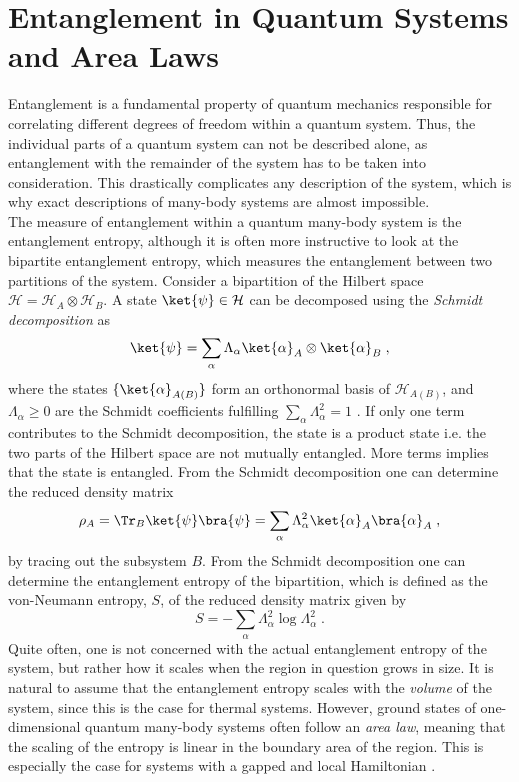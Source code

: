 \section{Entanglement in Quantum Systems and Area Laws}
Entanglement is a fundamental property of quantum mechanics responsible for correlating different degrees of freedom within a quantum system. Thus, the individual parts of a quantum system can not be described alone, as entanglement with the remainder of the system has to be taken into consideration. This drastically complicates any description of the system, which is why exact descriptions of many-body systems are almost impossible.\\
The measure of entanglement within a quantum many-body system is the entanglement entropy, although it is often more instructive to look at the bipartite entanglement entropy, which measures the entanglement between two partitions of the system.
Consider a bipartition of the Hilbert space $\mathcal{H} = \mathcal{H}_A \otimes \mathcal{H}_B$. A state $\ket{\psi} \in \mathcal{H}$ can be decomposed using the \textit{Schmidt decomposition} as
\begin{equation}
	\ket{\psi} = \sum_{\alpha} \Lambda_{\alpha} \ket{\alpha}_A \otimes \ket{\alpha}_B \; ,
\end{equation}
where the states $\{ \ket{\alpha}_{A(B)} \}$ form an orthonormal basis of $\mathcal{H}_{A(B)}$, and $\Lambda_{\alpha} \ge 0$ are the Schmidt coefficients fulfilling $\sum_{\alpha} \Lambda_{\alpha}^2 = 1$ \cite{Pathak2013}. If only one term contributes to the Schmidt decomposition, the state is a product state i.e. the two parts of the Hilbert space are not mutually entangled. More terms implies that the state is entangled. From the Schmidt decomposition one can determine the reduced density matrix
\begin{equation}
	\rho_A = \Tr _B \ket{\psi}\bra{\psi} = \sum_{\alpha} \Lambda_{\alpha}^2 \ket{\alpha}_A \bra{\alpha}_A \; ,  
\end{equation}
by tracing out the subsystem $B$. 
From the Schmidt decomposition one can determine the entanglement entropy of the bipartition, which is defined as the von-Neumann entropy, $S$, of the reduced density matrix given by \cite{Pathak2013}
\begin{equation}
	S = - \sum_{\alpha} \Lambda_{\alpha}^2 \log \Lambda_{\alpha}^2 \; .
\end{equation}
Quite often, one is not concerned with the actual entanglement entropy of the system, but rather how it scales when the region in question grows in size. It is natural to assume that the entanglement entropy scales with  the \textit{volume} of the system, since this is the case for thermal systems. However, ground states of one-dimensional quantum many-body systems often follow an \textit{area law}, meaning that the scaling of the entropy is linear in the boundary area of the region. This is especially the case for systems with a gapped and local Hamiltonian \cite{Cramer}.

